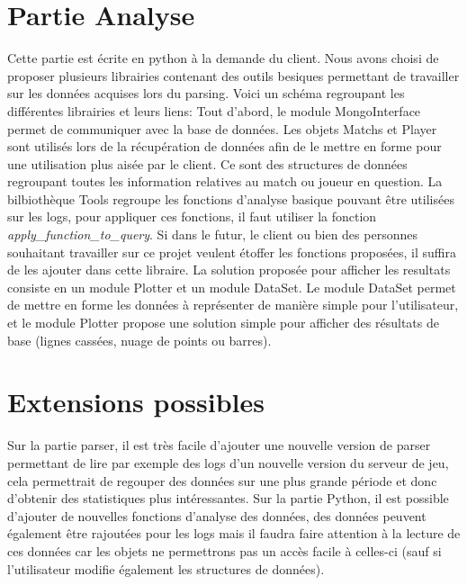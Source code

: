 \section{Partie Analyse}
Cette partie est écrite en python à la demande du client. Nous avons choisi de proposer plusieurs librairies contenant des outils besiques permettant de travailler sur les données acquises lors du parsing. Voici un schéma regroupant les différentes librairies et leurs liens:
Tout d'abord, le module MongoInterface permet de communiquer avec la base de données.\newline
Les objets Matchs et Player sont utilisés lors de la récupération de données afin de le mettre en forme pour une utilisation plus aisée par le client. Ce sont des structures de données regroupant toutes les information relatives au match ou joueur en question.\newline
La bilbiothèque Tools regroupe les fonctions d'analyse basique pouvant être utilisées sur les logs, pour appliquer ces fonctions, il faut utiliser la fonction \textit{apply\_function\_to\_query}. Si dans le futur, le client ou bien des personnes souhaitant travailler sur ce projet veulent étoffer les fonctions proposées, il suffira de les ajouter dans cette libraire.\newline
La solution proposée pour afficher les resultats consiste en un module Plotter et un module DataSet. Le module DataSet permet de mettre en forme les données à représenter de manière simple pour l'utilisateur, et le module Plotter propose une solution simple pour afficher des résultats de base (lignes cassées, nuage de points ou barres).

\section{Extensions possibles}
Sur la partie parser, il est très facile d'ajouter une nouvelle version de parser permettant de lire par exemple des logs d'un nouvelle version du serveur de jeu, cela permettrait de regouper des données sur une plus grande période et donc d'obtenir des statistiques plus intéressantes.\newline
Sur la partie Python, il est possible d'ajouter de nouvelles fonctions d'analyse des données, des données peuvent également être rajoutées pour les logs mais il faudra faire attention à la lecture de ces données car les objets ne permettrons pas un accès facile à celles-ci (sauf si l'utilisateur modifie également les structures de données).


